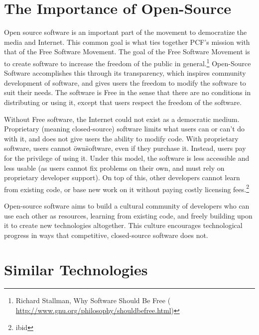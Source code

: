 \documentclass[a4paper,12pt]{report}
\begin{document}
\section {The Importance of Open-Source}
Open source software is an important part of the movement to democratize the media and Internet.
This common goal is what ties together PCF's mission with that of the Free Software Movement.
The goal of the Free Software Movement is to create software to increase the freedom of the public in general.\footnote{Richard Stallman, Why Software Should Be Free (\url{ http://www.gnu.org/philosophy/shouldbefree.html})}
Open-Source Software accomplishes this through its transparency, which inspires community development of software, and gives users the freedom to modify the software to suit their needs.
The software is Free in the sense that there are no conditions in distributing or using it, except that users respect the freedom of the software.


Without Free software, the Internet could not exist as a democratic medium.
Proprietary (meaning closed-source) software limits what users can or can't do with it, and does not give users the ability to modify code.
With proprietary software, users cannot \"own\" software, even if they purchase it.
Instead, users pay for the privilege of using it.
Under this model, the software is less accessible and less usable (as users cannot fix problems on their own, and must rely on proprietary developer support).
On top of this, other developers cannot learn from existing code, or base new work on it without paying costly licensing fees.\footnote{ibid} 


Open-source software aims to build a cultural community of developers who can use each other as resources, learning from existing code, and freely building upon it to create new technologies altogether.
This culture encourages technological progress in ways that competitive, closed-source software does not. 

\section {Similar Technologies}
\end{document}
